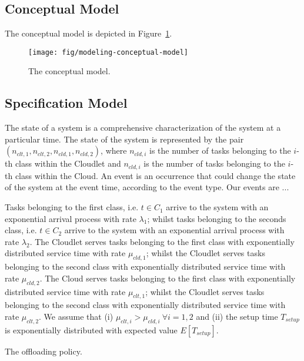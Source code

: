 \subsection{Conceptual Model}
The conceptual model is depicted in Figure~\ref{fig:modeling-conceptual-model}.

\begin{figure}
	\texttt{[image: fig/modeling-conceptual-model]}
	\caption{The conceptual model.}
	\label{fig:modeling-conceptual-model}
\end{figure}

\subsection{Specification Model}
The state of a system is a comprehensive characterization of the system at a particular time.
The state of the system is represented by the pair $(n_{clt,1},n_{clt,2},n_{cld,1},n_{cld,2})$, where $n_{cld,i}$ is the number of tasks belonging to the $i$-th class within the Cloudlet and $n_{cld,i}$ is the number of tasks belonging to the $i$-th class within the Cloud.
An event is an occurrence that could change the state of the system at the event time, according to the event type.
Our events are ...

Tasks belonging to the first class, i.e. $t\in C_{1}$ arrive to the system with an exponential arrival process with rate $ \lambda_{1}$; whilst tasks belonging to the seconds class, i.e. $t\in C_{2}$ arrive to the system with an exponential arrival process with rate $ \lambda_{2}$.
The Cloudlet serves tasks belonging to the first class with exponentially distributed service time with rate $\mu_{cld,1}$; whilst the Cloudlet serves tasks belonging to the second class with exponentially distributed service time with rate $\mu_{cld,2}$.
The Cloud serves tasks belonging to the first class with exponentially distributed service time with rate $\mu_{clt,1}$; whilst the Cloudlet serves tasks belonging to the second class with exponentially distributed service time with rate $\mu_{clt,2}$.
We assume that 
(i) $\mu_{clt,i}>\mu_{cld,i}\ \forall i=1,2$ and
(ii) the setup time $T_{setup}$ is exponentially distributed with expected value $E[T_{setup}]$.

\begin{algorithm}
	\SetAlgoLined
	\caption{The offloading policy.}
	\label{alg:modeling-offloading-policy}
\end{algorithm}

